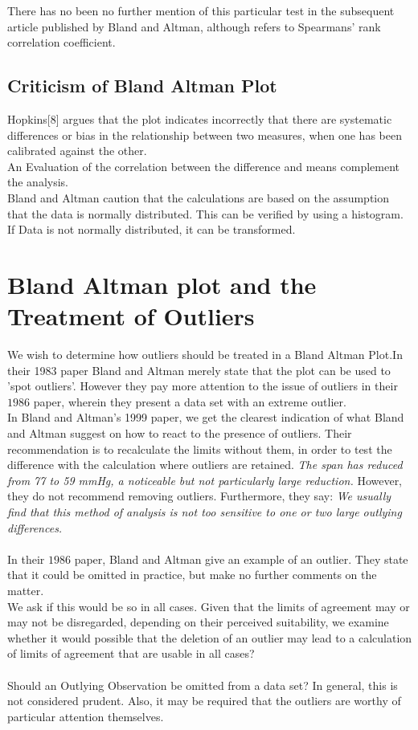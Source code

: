 \documentclass[12pt, a4paper]{report}
\begin{document}
There has no been no further mention of this particular test in
the subsequent article published by Bland and Altman, although
\citet{BA99} refers to Spearmans' rank correlation coefficient.

\subsection{Criticism of Bland Altman Plot}
Hopkins[$8$] argues that the plot indicates incorrectly that there
are systematic differences or bias in the relationship between two
measures, when one has been calibrated against the other.
\\
An Evaluation of the correlation between the difference and means
complement the analysis.
\\
Bland and Altman caution that the calculations are based on the
assumption that the data is normally distributed. This can be
verified by using a histogram. If Data is not normally
distributed, it can be transformed.
\section{Bland Altman plot and the Treatment of Outliers}
We wish to determine how outliers should be treated in a Bland
Altman Plot.In their 1983 paper Bland and Altman  merely state
that the plot can be used to 'spot outliers'. However they pay
more attention to the issue of outliers in their $1986$ paper,
wherein they present a data set with an extreme outlier.
\\
In Bland and Altman's 1999 paper, we get the clearest indication
of what Bland and Altman suggest on how to react to the presence
of outliers. Their recommendation is to recalculate the limits
without them, in order to test the difference with the calculation
where outliers are retained. \emph{The span has reduced from 77 to
59 mmHg, a noticeable but not particularly large reduction.}
However, they do not recommend removing outliers. Furthermore,
they say: \emph{We usually find that this method of analysis is
not too sensitive to one or two large outlying differences.}
\\
\\
In  their $1986$ paper, Bland and Altman give an example of an
outlier. They state that it could be omitted in practice, but make
no further comments on the matter.
\\
We ask if this would be so in all cases. Given that the limits of
agreement may or may not be disregarded, depending on their
perceived suitability, we examine whether it would possible that
the deletion of an outlier may lead to a calculation of limits of
agreement that are usable in all cases?
\\
\\
Should an Outlying Observation be omitted from a data set? In
general, this is not considered prudent. Also, it may be required
that the outliers are worthy of particular attention themselves.
\end{document}
